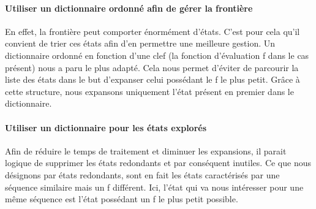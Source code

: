 \documentclass[10pt,a4paper]{report}
\begin{document}
\paragraph{Utiliser un dictionnaire ordonné afin de gérer la frontière}{En effet, la frontière peut comporter énormément d'états. C'est pour cela qu'il convient de trier ces états afin d'en permettre une meilleure gestion. Un dictionnaire ordonné en fonction d'une clef (la fonction d'évaluation f dans le cas présent) nous a paru le plus adapté. Cela nous permet d'éviter de parcourir la liste des états dans le but d'expanser celui possédant le f le plus petit. Grâce à cette structure, nous expansons uniquement l'état présent en premier dans le dictionnaire.}
\paragraph{Utiliser un dictionnaire pour les états explorés}{Afin de réduire le temps de traitement et diminuer les expansions, il parait logique de supprimer les états redondants et par conséquent inutiles. Ce que nous désignons par états redondants, sont en fait les états caractérisés par une séquence similaire mais un f différent. Ici, l'état qui va nous intéresser pour une même séquence est l'état possédant un f le plus petit possible.}
\end{document}
